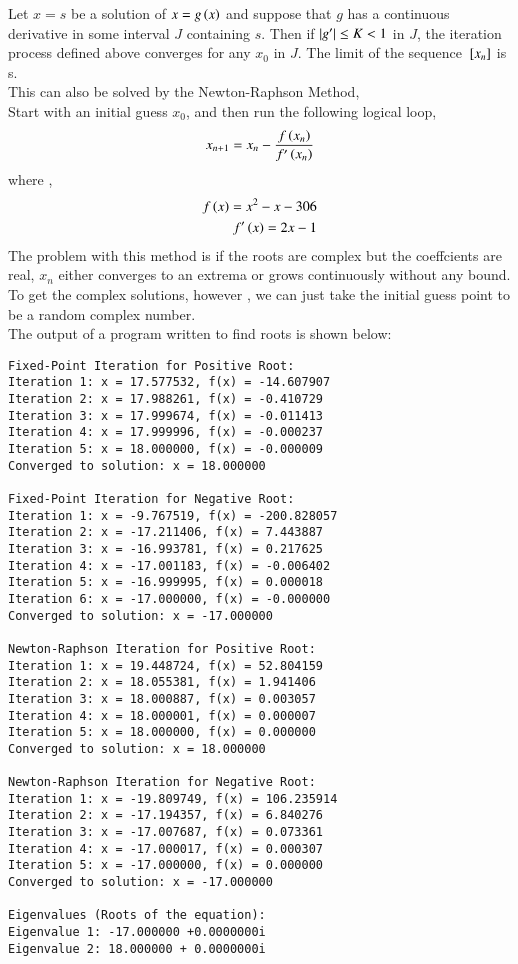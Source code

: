 \documentclass[journal]{IEEEtran}
\begin{document}
Let $x = s$ be a solution of $x = g\left(x\right)$ and suppose that $g$ has a continuous
derivative in some interval $J$ containing $s$. Then if $\left\vert g^{\prime}\right\vert \le K < 1$ in $J$,
the iteration process defined  above converges for any $x_0$ in $J$. The limit of the sequence
${}\left[x_n\right]$ is s.\\
\newline
This can also be solved by the Newton-Raphson Method,\\
Start with an initial guess $x_0$, and then run the following logical loop,
\begin{align}
    x_{n+1} = x_n - \frac{f\left(x_n\right)}{f^{\prime}\left(x_n\right)} 
\end{align}
where ,
\begin{align}
    f\left(x\right) = x^2 - x - 306\\
    f^{\prime}\left(x\right) = 2x-1
\end{align}
\newline
The problem with this method is if the roots are complex but the coeffcients are real, $x_n$ either converges to an extrema or grows continuously without any bound.
To get the complex solutions, however , we can just take the initial guess point to be a 
random complex number.\\
The output of a program written to find roots is shown below:
\begin{verbatim}
Fixed-Point Iteration for Positive Root:
Iteration 1: x = 17.577532, f(x) = -14.607907
Iteration 2: x = 17.988261, f(x) = -0.410729
Iteration 3: x = 17.999674, f(x) = -0.011413
Iteration 4: x = 17.999996, f(x) = -0.000237
Iteration 5: x = 18.000000, f(x) = -0.000009
Converged to solution: x = 18.000000

Fixed-Point Iteration for Negative Root:
Iteration 1: x = -9.767519, f(x) = -200.828057
Iteration 2: x = -17.211406, f(x) = 7.443887
Iteration 3: x = -16.993781, f(x) = 0.217625
Iteration 4: x = -17.001183, f(x) = -0.006402
Iteration 5: x = -16.999995, f(x) = 0.000018
Iteration 6: x = -17.000000, f(x) = -0.000000
Converged to solution: x = -17.000000

Newton-Raphson Iteration for Positive Root:
Iteration 1: x = 19.448724, f(x) = 52.804159
Iteration 2: x = 18.055381, f(x) = 1.941406
Iteration 3: x = 18.000887, f(x) = 0.003057
Iteration 4: x = 18.000001, f(x) = 0.000007
Iteration 5: x = 18.000000, f(x) = 0.000000
Converged to solution: x = 18.000000

Newton-Raphson Iteration for Negative Root:
Iteration 1: x = -19.809749, f(x) = 106.235914
Iteration 2: x = -17.194357, f(x) = 6.840276
Iteration 3: x = -17.007687, f(x) = 0.073361
Iteration 4: x = -17.000017, f(x) = 0.000307
Iteration 5: x = -17.000000, f(x) = 0.000000
Converged to solution: x = -17.000000

Eigenvalues (Roots of the equation):
Eigenvalue 1: -17.000000 +0.0000000i
Eigenvalue 2: 18.000000 + 0.0000000i
\end{verbatim}
\end{document}
